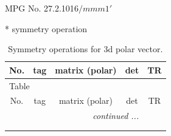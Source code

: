 \documentclass[fleqn,8pt]{jsarticle}
\begin{document}
\setcounter{MaxMatrixCols}{32}

\renewcommand{\tablename}{Table~}
\renewcommand{\figurename}{Figure~}
\begin{center}
\LARGE
MPG No. 27.2.101\quad$6/mmm1'$
\end{center}
* symmetry operation
\renewcommand{\arraystretch}{1.3}
\begin{longtable}{ccccc}
\caption{Symmetry operations for 3d polar vector.}
 \\
 \hline \hline
No. & tag & matrix (polar) & det & TR \\ \hline \endfirsthead

\multicolumn{4}{l}{\tablename\ \thetable{}} \\
 \hline \hline
No. & tag & matrix (polar) & det & TR \\ \hline \endhead

 \hline \hline
\multicolumn{4}{r}{\footnotesize\it continued ...} \\ \endfoot

 \hline \hline
\multicolumn{4}{r}{} \\ \endlastfoot


\end{longtable}
\end{document}
